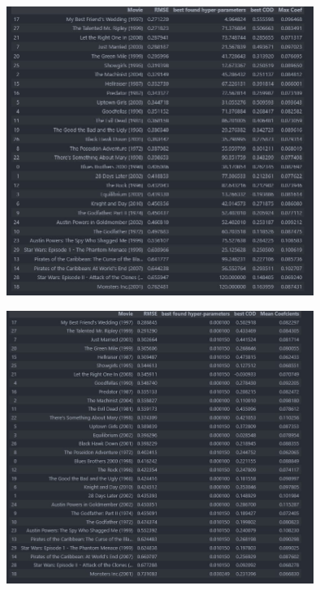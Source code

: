 \documentclass{article}
\begin{document}
\begin{figure}[t]
  \centering

  \includegraphics[width=10cm]{data anlysis project 2/ridge_fig.jpg}
 \caption{}
 \label{fig:1}
\end{figure}
\begin{figure}[t]
  \centering

  \includegraphics[width=10cm]{data anlysis project 2/lasso_fig.jpg}
 \caption{}
 \label{fig:1}
\end{figure}
\end{document}
